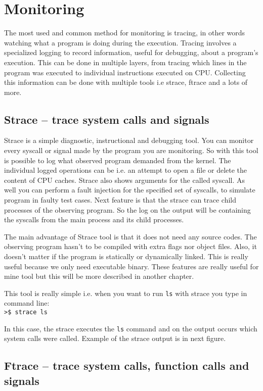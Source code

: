 \section{Monitoring}
The most used and common method for monitoring is tracing, in other words watching what a program is doing during the execution.
Tracing involves a specialized logging to record information, useful for debugging, about a program's execution.
This can be done in multiple layers, from tracing which lines in the program was executed to individual instructions executed on CPU.
Collecting this information can be done with multiple tools i.e strace, ftrace and a lots of more.

\subsection{Strace -- trace system calls and signals}

Strace is a simple diagnostic, instructional and debugging tool.
You can monitor every syscall or signal made by the program you are monitoring.
So with this tool is possible to log what observed program demanded from the kernel.
The individual logged operations can be i.e. an attempt to open a file or delete the content of CPU caches.
Strace also shows arguments for the called syscall.
As well you can perform a fault injection for the specified set of syscalls, to simulate program in faulty test cases.
Next feature is that the strace can trace child processes of the observing program.
So the log on the output will be containing the syscalls from the main process and its child processes.

The main advantage of Strace tool is that it does not need any source codes.
The observing program hasn't to be compiled with extra flags nor object files.
Also, it doesn't matter if the program is statically or dynamically linked.
This is really useful because we only need executable binary.
These features are really useful for mine tool but this will be more described in another chapter.

This tool is really simple i.e. when you want to run \texttt{ls} with strace you type in command line:\\
\texttt{>\$ strace ls}

In this case, the strace executes the \texttt{ls} command and on the output occurs which system calls were called.
Example of the strace output is in next figure. 

\subsection{Ftrace -- trace system calls, function calls and signals}

